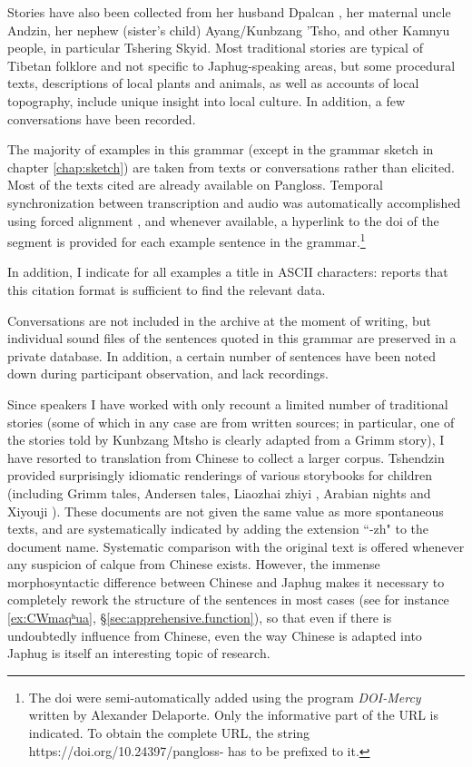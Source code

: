 Stories  have also been collected from her husband  Dpalcan , her maternal uncle Andzin, her nephew (sister's child) Ayang/Kunbzang 'Tsho, and other Kamnyu people, in particular  Tshering Skyid. Most traditional stories are typical of Tibetan folklore and not specific to Japhug-speaking areas, but some procedural texts, descriptions of local plants and animals, as well as accounts of local topography, include unique insight into local culture. In addition, a few conversations have been recorded.
 
The majority of examples in this grammar (except in the grammar sketch in chapter \ref{chap:sketch}) are taken from texts or conversations rather than elicited. Most of the texts cited are already available on Pangloss. 
Temporal synchronization between transcription and audio was automatically accomplished using forced alignment \citep{macaire20alignement}, and whenever available, a hyperlink to the doi of the segment \citep{vasile20doi}  is provided for each example sentence in the grammar.\footnote{The doi were semi-automatically added using the program \textit{DOI-Mercy} written by Alexander Delaporte. Only the informative part of the URL is indicated. To obtain the complete URL, the string {https://doi.org/10.24397/pangloss-} has to be prefixed to it. }

In addition, I indicate for all examples a title in ASCII characters:  \citet[305]{hill17statest} reports that this citation format is sufficient to find the relevant data. 

Conversations are not included in the archive at the moment of writing, but individual sound files of the sentences quoted in this grammar are preserved in a private database. In addition, a certain number of sentences have been noted down during participant observation, and lack recordings.
 
Since speakers I have worked with only recount a limited number of traditional stories (some of which in any case are from written sources; in particular, one of the stories told by Kunbzang Mtsho is clearly adapted from a Grimm story), I have resorted to translation from Chinese to collect a larger corpus. Tshendzin provided surprisingly idiomatic renderings of various storybooks for children (including Grimm tales, Andersen tales, Liaozhai zhiyi , Arabian nights and Xiyouji ). These documents are not given the same value as more spontaneous texts, and are systematically indicated  by adding the extension ``-zh" to the document name. Systematic comparison with the original text is offered whenever any suspicion of calque from Chinese exists. However, the immense morphosyntactic difference between Chinese and Japhug makes it necessary to completely rework the structure of the sentences in most cases (see for instance \ref{ex:CWmaqʰua}, §\ref{sec:apprehensive.function}), so that even if there is undoubtedly influence from Chinese, even the way Chinese is adapted into Japhug is itself an interesting topic of research.

